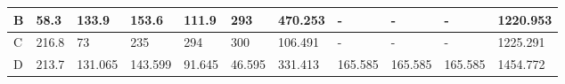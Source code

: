 \begin{landscape}
\begin{longtable}[c]{|l|llllllllll|}
  B                                                                               & \multicolumn{1}{l|}{58.3}                                                           & \multicolumn{1}{l|}{133.9}                                                          & \multicolumn{1}{l|}{153.6}                                                          & \multicolumn{1}{l|}{111.9}                                                          & \multicolumn{1}{l|}{293}                                                            & \multicolumn{1}{l|}{470.253}                                                        & \multicolumn{1}{l|}{-}                                         & \multicolumn{1}{l|}{-}                                         & \multicolumn{1}{l|}{-}                                             & 1220.953                                                                               \\ \hline
  C                                                                               & \multicolumn{1}{l|}{216.8}                                                          & \multicolumn{1}{l|}{73}                                                             & \multicolumn{1}{l|}{235}                                                            & \multicolumn{1}{l|}{294}                                                            & \multicolumn{1}{l|}{300}                                                            & \multicolumn{1}{l|}{106.491}                                                        & \multicolumn{1}{l|}{-}                                         & \multicolumn{1}{l|}{-}                                         & \multicolumn{1}{l|}{-}                                             & 1225.291                                                                               \\ \hline
  D                                                                               & \multicolumn{1}{l|}{213.7}                                                          & \multicolumn{1}{l|}{131.065}                                                        & \multicolumn{1}{l|}{143.599}                                                        & \multicolumn{1}{l|}{91.645}                                                         & \multicolumn{1}{l|}{46.595}                                                         & \multicolumn{1}{l|}{331.413}                                                        & \multicolumn{1}{l|}{165.585}                                   & \multicolumn{1}{l|}{165.585}                                   & \multicolumn{1}{l|}{165.585}                                       & 1454.772                                                                               \\ \hline

\end{longtable}
\end{landscape}
